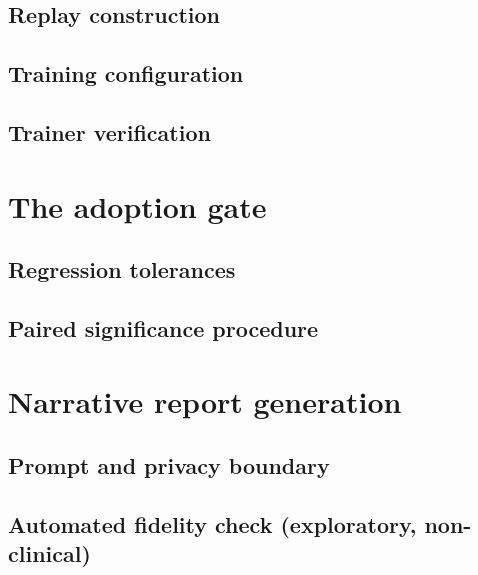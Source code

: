 \subsection{Replay construction}
\subsection{Training configuration}
\subsection{Trainer verification}

\section{The adoption gate}\label{sec:gate}
\subsection{Regression tolerances}
\subsection{Paired significance procedure}

\section{Narrative report generation}
\subsection{Prompt and privacy boundary}
\subsection{Automated fidelity check (exploratory, non-clinical)}
